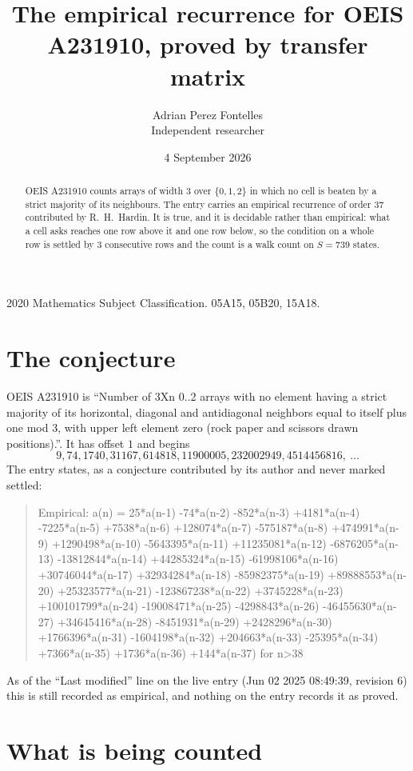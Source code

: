\documentclass[11pt,a4paper]{article}
\title{The empirical recurrence for OEIS A231910, proved by transfer matrix}
\author{Adrian Perez Fontelles\\ \small Independent researcher}
\date{4 September 2026}
\theoremstyle{plain}
\theoremstyle{definition}
\begin{document}
\maketitle

\begin{abstract}
OEIS A231910 counts arrays of width $3$ over $\{0,1,2\}$ in which no cell is beaten by a strict majority of its neighbours. The entry carries an
empirical recurrence of order $37$ contributed by R.~H.~Hardin. It is true, and it is
decidable rather than empirical: what a cell asks reaches one row above
it and one row below, so the condition on a whole row is settled by
$3$ consecutive rows and the count is a walk count on $S=739$ states.
\end{abstract}

\noindent\small 2020 Mathematics Subject Classification. 05A15, 05B20, 15A18.\normalsize

\section{The conjecture}

OEIS A231910 is ``Number of 3Xn 0..2 arrays with no element having a strict majority of its horizontal, diagonal and antidiagonal neighbors equal to itself plus one mod 3, with upper left element zero (rock paper and scissors drawn positions).''. It has offset $1$ and begins
\[
9, 74, 1740, 31167, 614818, 11900005, 232002949, 4514456816,\ \dots
\]
The entry states, as a conjecture contributed by its author and never marked settled:
\begin{quote}
Empirical: a(n) = 25*a(n-1) -74*a(n-2) -852*a(n-3) +4181*a(n-4) -7225*a(n-5) +7538*a(n-6) +128074*a(n-7) -575187*a(n-8) +474991*a(n-9) +1290498*a(n-10) -5643395*a(n-11) +11235081*a(n-12) -6876205*a(n-13) -13812844*a(n-14) +44285324*a(n-15) -61998106*a(n-16) +30746044*a(n-17) +32934284*a(n-18) -85982375*a(n-19) +89888553*a(n-20) +25323577*a(n-21) -123867238*a(n-22) +3745228*a(n-23) +100101799*a(n-24) -19008471*a(n-25) -4298843*a(n-26) -46455630*a(n-27) +34645416*a(n-28) -8451931*a(n-29) +2428296*a(n-30) +1766396*a(n-31) -1604198*a(n-32) +204663*a(n-33) -25395*a(n-34) +7366*a(n-35) +1736*a(n-36) +144*a(n-37) for n>38
\end{quote}
As of the ``Last modified'' line on the live entry (Jun 02 2025 08:49:39, revision 6) this is still
recorded as empirical, and nothing on the entry records it as proved.

\section{What is being counted}
\end{document}
